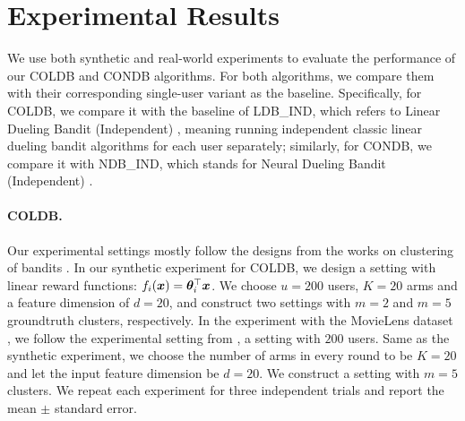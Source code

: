 \section{Experimental Results}
\label{sec:experiments}

We use both synthetic and real-world experiments to evaluate the performance of our COLDB and CONDB algorithms.
For both algorithms, we compare them with their corresponding single-user variant as the baseline. Specifically, for COLDB, we compare it with the baseline of LDB\_IND, which refers to Linear Dueling Bandit (Independent) \cite{ICML22_bengs2022stochastic}, meaning running independent classic linear dueling bandit algorithms for each user separately; similarly, for CONDB, we compare it with NDB\_IND, which stands for Neural Dueling Bandit (Independent) \cite{verma2024neural}.

\paragraph{COLDB.}
Our experimental settings mostly follow the designs from the works on clustering of bandits \cite{wang2024onlinea,10.5555/3367243.3367445}.
In our synthetic experiment for COLDB, we design a setting with linear reward functions: $f_i(\boldsymbol{x})=\boldsymbol{\theta}_i^{\top} \boldsymbol{x}$.
We choose $u=200$ users, $K=20$ arms and a feature dimension of $d=20$, and construct two settings with $m=2$ and $m=5$ groundtruth clusters, respectively.
In the experiment with the MovieLens dataset \cite{harper2015movielens}, we follow the experimental setting from \citet{wang2024onlinea}, a setting with $200$ users.
Same as the synthetic experiment, we choose the number of arms in every round to be $K=20$ and let the input feature dimension be $d=20$. We construct a setting with $m=5$ clusters.
We repeat each experiment for three independent trials and report the mean $\pm$ standard error.


